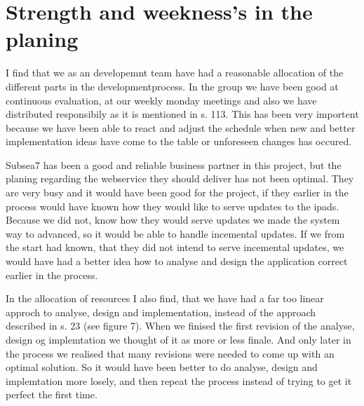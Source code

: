 \section{Strength and weekness's in the planing}
    I find that we as an developemnt team have had a reasonable allocation of
    the different parts in the developmentprocess. In the group we have been
    good at continuous evaluation, at our weekly monday meetings and also we
    have distributed responsibily as it is mentioned in \cite{oose} s. 113.
    This has been very importent because we have been able to react and adjust
    the schedule when new and better implementation ideas have come to the
    table or unforeseen changes has occured.

    Subsea7 has been a good and reliable business partner in this project, but
    the planing regarding the webservice they should deliver has not been
    optimal. They are very busy and it would have been good for the project, if
    they earlier in the process would have known how they would like to  serve
    updates to the ipads. Because we did not, know how they would serve updates
    we made the system way to advanced, so it would be able to handle
    incemental updates. If we from the start had known, that they did not
    intend to serve incemental updates, we would have had a better idea how to
    analyse and design the application correct earlier in the process.

    In the allocation of resources I also find, that we have had a far too
    linear approch to analyse, design and implementation, instead of the
    approach described in \cite{mad-article} s. 23 (see figure 7). When we
    finised the first revision of the analyse, design og implemtation we
    thought of it as more or less finale. And only later in the process we
    realised that many revisions were needed to come up with an optimal
    solution. So it would have been better to do analyse, design and
    implemtation more losely, and then repeat the process instead of trying to
    get it perfect the first time.
